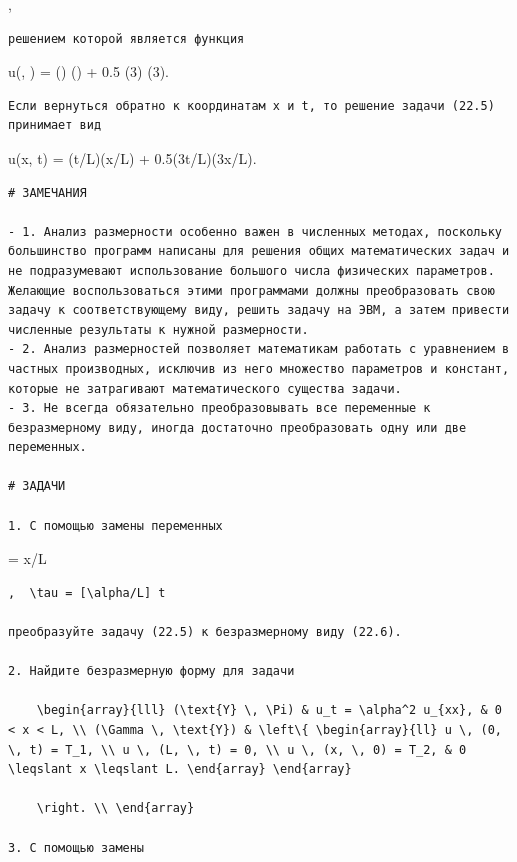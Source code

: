 \documentclass[
  ukrainian,
]{article}
\begin{document}
 \leqslant \xi {},

\begin{verbatim}
решением которой является функция
\end{verbatim}

u(\xi, \tau) = \cos(\pi \tau) \sin(\pi \xi) + 0.5 \cos(3\pi \tau)
\sin(3\pi \xi).

\begin{verbatim}
Если вернуться обратно к координатам x и t, то решение задачи (22.5) принимает вид
\end{verbatim}

u(x, t) = \cos(\pi \alpha t/L)\sin(\pi x/L) +
0.5\cos(3\pi \alpha t/L)\sin(3\pi x/L).

\begin{verbatim}
# ЗАМЕЧАНИЯ

- 1. Анализ размерности особенно важен в численных методах, поскольку большинство программ написаны для решения общих математических задач и не подразумевают использование большого числа физических параметров. Желающие воспользоваться этими программами должны преобразовать свою задачу к соответствующему виду, решить задачу на ЭВМ, а затем привести численные результаты к нужной размерности.
- 2. Анализ размерностей позволяет математикам работать с уравнением в частных производных, исключив из него множество параметров и констант, которые не затрагивают математического существа задачи.
- 3. Не всегда обязательно преобразовывать все переменные к безразмерному виду, иногда достаточно преобразовать одну или две переменных.

# ЗАДАЧИ

1. С помощью замены переменных
\end{verbatim}

\xi = x/L

\begin{verbatim}
,  \tau = [\alpha/L] t 

преобразуйте задачу (22.5) к безразмерному виду (22.6).

2. Найдите безразмерную форму для задачи

    \begin{array}{lll} (\text{Y} \, \Pi) & u_t = \alpha^2 u_{xx}, & 0 < x < L, \\ (\Gamma \, \text{Y}) & \left\{ \begin{array}{ll} u \, (0, \, t) = T_1, \\ u \, (L, \, t) = 0, \\ u \, (x, \, 0) = T_2, & 0 \leqslant x \leqslant L. \end{array} \end{array}

    \right. \\ \end{array}

3. С помощью замены
\end{verbatim}
\end{document}

